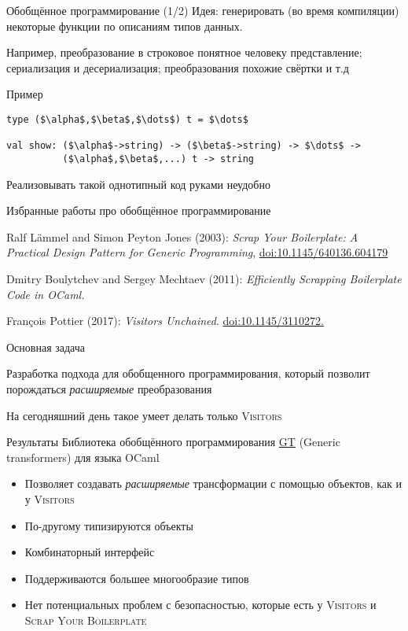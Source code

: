 \documentclass[
  russian,
  aspectratio=43,
  xcolor={svgnames},
  hyperref={colorlinks,citecolor=DeepPink4,linkcolor=DarkRed,urlcolor=DarkBlue}]{beamer}
\begin{document}
\begin{frame}[fragile]{Обобщённое программирование (1/2)}
Идея: генерировать (во время компиляции) некоторые функции по описаниям типов данных. 

Например, преобразование в строковое понятное человеку представление; сериализация и десериализация; преобразования похожие свёртки и т.д

\vspace{0.5cm}Пример 

\begin{lstlisting}[style=ocaml1]
type ($\alpha$,$\beta$,$\dots$) t = $\dots$

val show: ($\alpha$->string) -> ($\beta$->string) -> $\dots$ -> 
          ($\alpha$,$\beta$,...) t -> string
\end{lstlisting}
Реализовывать такой однотипный код руками неудобно
\end{frame}

\begin{frame}[fragile]{Избранные работы про обобщённое программирование}

Ralf Lämmel and Simon Peyton Jones (2003): \textit{Scrap Your Boilerplate: A Practical Design Pattern for Generic Programming}, \href{http://dx.doi.org/10.1145/640136.604179}{doi:10.1145/640136.604179} \vspace{1cm}

Dmitry Boulytchev and Sergey Mechtaev (2011): \textit{Efficiently Scrapping Boilerplate Code in OCaml.} \vspace{1cm}

François Pottier (2017): \textit{Visitors Unchained}. \href{http://dx.doi.org/10.1145/3110272}{doi:10.1145/3110272.}
\end{frame}

\begin{frame}[fragile]{Основная задача}

Разработка подхода для обобщенного программирования, который позволит 
порождаться \emph{расширяемые} преобразования\vspace{1cm}

На сегодняшний день такое умеет делать только \textsc{Visitors}
\end{frame}

\begin{frame}[fragile]{Результаты}
Библиотека обобщённого программирования \href{https://github.com/Kakadu/GT/tree/ppx/}{GT} (Generic transformers) для языка OCaml
\begin{itemize}
 \item Позволяет создавать \emph{расширяемые} трансформации с помощью объектов, как и у \textsc{Visitors}
 \item По-другому типизируются объекты
 \item Комбинаторный интерфейс
 \item Поддерживаются большее многообразие типов
 \item Нет потенциальных проблем с безопасностью, которые есть у \textsc{Visitors} и \textsc{Scrap Your Boilerplate}
\end{itemize}

\end{frame}
\end{document}
